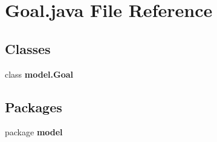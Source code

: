 \section{Goal.\+java File Reference}
\label{_goal_8java}
\subsection*{Classes}
\begin{DoxyCompactItemize}
\item 
class \textbf{ model.\+Goal}
\end{DoxyCompactItemize}
\subsection*{Packages}
\begin{DoxyCompactItemize}
\item 
package \textbf{ model}
\end{DoxyCompactItemize}
